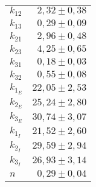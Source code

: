 \begin{tabular}{lr}
\toprule
$k_{12}$    &$2,32 \pm0,38$ \\
$k_{13}$    &$0,29 \pm0,09$ \\
$k_{21}$    &$2,96 \pm0,48$ \\
$k_{23}$    &$4,25 \pm0,65$ \\
$k_{31}$    &$0,18 \pm0,03$ \\
$k_{32}$    &$0,55 \pm0,08$ \\
$k_{1_E}$   &$22,05\pm2,53$ \\
$k_{2_E}$   &$25,24\pm2,80$ \\
$k_{3_E}$   &$30,74\pm3,07$ \\
$k_{1_I}$   &$21,52\pm2,60$ \\
$k_{2_I}$   &$29,59\pm2,94$ \\
$k_{3_I}$   &$26,93\pm3,14$ \\
\midrule
$n$ &    $0,29\pm0,04$ \\
\bottomrule
\end{tabular}
